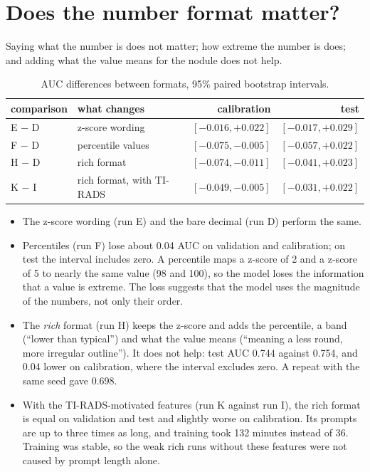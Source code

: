 \section{Does the number format matter?}
\label{sec:results-format}

Saying what the number is does not matter; how extreme the number is does; and adding what the
value means for the nodule does not help.

\begin{table}[ht]
  \centering
  \caption{AUC differences between formats, 95\% paired bootstrap intervals.}
  \label{tab:results-format}
  \begin{tabular}{llrr}
    \toprule
    comparison & what changes & calibration & test \\
    \midrule
    E $-$ D & z-score wording               & $[-0.016, +0.022]$ & $[-0.017, +0.029]$ \\
    F $-$ D & percentile values             & $[-0.075, -0.005]$ & $[-0.057, +0.022]$ \\
    H $-$ D & rich format                   & $[-0.074, -0.011]$ & $[-0.041, +0.023]$ \\
    K $-$ I & rich format, with TI-RADS     & $[-0.049, -0.005]$ & $[-0.031, +0.022]$ \\
    \bottomrule
  \end{tabular}
\end{table}

\begin{itemize}
  \item The z-score wording (run E) and the bare decimal (run D) perform the same.
  \item Percentiles (run F) lose about 0.04 AUC on validation and calibration; on test the
        interval includes zero. A percentile maps a z-score of 2 and a z-score of 5 to nearly the
        same value (98 and 100), so the model loses the information that a value is extreme.
        The loss suggests that the model uses the magnitude of the numbers, not only their order.
  \item The \emph{rich} format (run H) keeps the z-score and adds the percentile, a band
        (``lower than typical'') and what the value means (``meaning a less round, more irregular
        outline''). It does not help: test AUC 0.744 against 0.754, and 0.04 lower on calibration,
        where the interval excludes zero. A repeat with the same seed gave 0.698.
  \item With the TI-RADS-motivated features (run K against run I), the rich format is equal on
        validation and test and slightly worse on calibration. Its prompts are up to three times
        as long, and training took 132 minutes instead of 36. Training was stable, so the weak
        rich runs without these features were not caused by prompt length alone.
\end{itemize}

